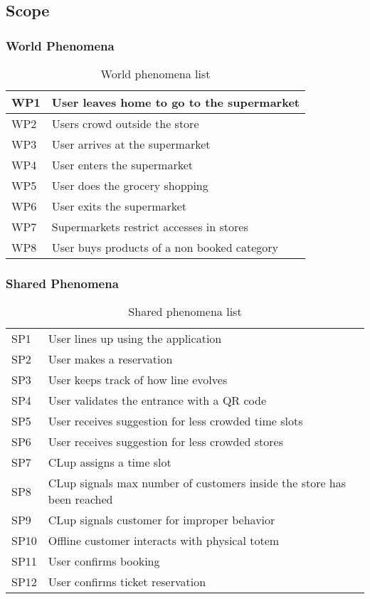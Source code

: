 \subsection{Scope}


\subsubsection{World Phenomena}

\begin{table}[H]
\begin{tabular}{l|l}
	WP1 & User leaves home to go to the supermarket\\\hline
	WP2 & Users crowd outside the store\\\hline
    WP3 & User arrives at the supermarket\\\hline
    WP4 & User enters the supermarket \\\hline
	WP5 & User does the grocery shopping \\\hline
	WP6 & User exits the supermarket\\\hline
	WP7 & Supermarkets restrict accesses in stores\\\hline %
	WP8 & User buys products of a non booked category\\\hline %
\end{tabular}
\caption{World phenomena list}
\label{tab:WorldPhen}
\end{table}

\subsubsection{Shared Phenomena}
\begin{table} [H]
\begin{tabular}{l|l}
	SP1 & User lines up using the application \\
	SP2 & User makes a reservation \\
	SP3 & User keeps track of how line evolves \\
	SP4 & User validates the entrance with a QR code \\
	SP5 & User receives suggestion for less crowded time slots \\
	SP6 & User receives suggestion for less crowded stores \\
	SP7 & CLup assigns a time slot \\
	SP8 & CLup signals max number of customers inside the store has been reached \\
	SP9 & CLup signals customer for improper behavior \\
	SP10 & Offline customer interacts with physical totem \\
	SP11 & User confirms booking \\
	SP12 & User confirms ticket reservation \\
	
\end{tabular}
\caption{Shared phenomena list}
\label{tab:SharedPhen}
\end{table}
